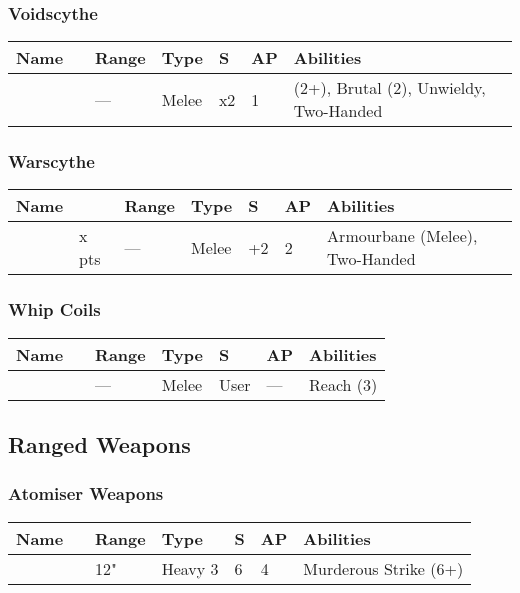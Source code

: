 \subsubsection{Voidscythe} \label{Voidscythe}
\noindent
\begin{tabular}{||m{110pt} m{30pt} m{31pt} m{55pt} m{12pt} m{12pt} m{210pt}||}
	\hline
	Name & & Range & Type & S & AP & Abilities \\
	\hline
	\quickref{Voidscythe} &  & — & Melee & x2 & 1 & \quickref{Entropic Strike} (2+), Brutal (2), Unwieldy, Two-Handed \\
	\hline
\end{tabular}

\subsubsection{Warscythe}
\label{Warscythe}
\noindent
\begin{tabular}{||m{110pt} m{30pt} m{31pt} m{55pt} m{12pt} m{12pt} m{210pt}||}
	\hline
	Name & & Range & Type & S & AP & Abilities \\
	\hline
	\quickref{Warscythe} & x pts& — & Melee & +2 & 2 & Armourbane (Melee), Two-Handed \\
	\hline
\end{tabular}

\subsubsection{Whip Coils}
\label{Whip Coils}
\noindent
\begin{tabular}{||m{110pt} m{30pt} m{31pt} m{55pt} m{12pt} m{12pt} m{210pt}||}
	\hline
	Name & & Range & Type & S & AP & Abilities \\
	\hline
	\quickref{Whip Coils} & & — & Melee & User & — & Reach (3) \\
	\hline
\end{tabular}



\subsection{Ranged Weapons} \label{Ranged Weapons}


\subsubsection{Atomiser Weapons}

\label{Atomiser Beam Lance}
\noindent
\begin{tabular}{||m{110pt} m{30pt} m{31pt} m{55pt} m{12pt} m{12pt} m{210pt}||}
	\hline
	Name & & Range & Type & S & AP & Abilities \\
	\hline
	\quickref{Atomiser Beam Lance} & & 12" & Heavy 3 & 6 & 4 & Murderous Strike (6+) \\
	\hline
\end{tabular}


